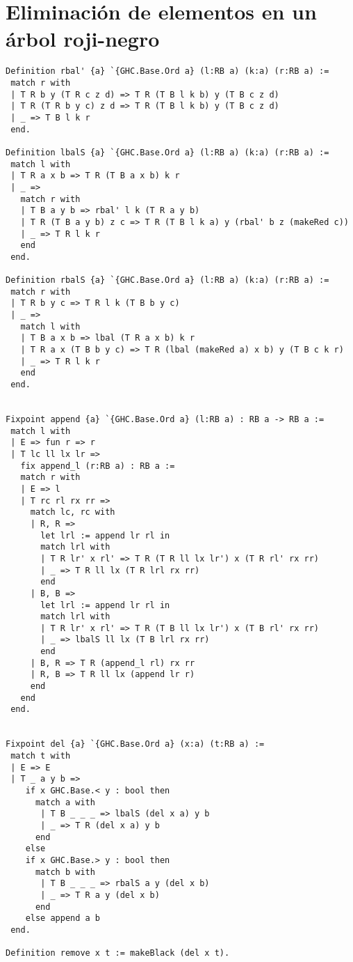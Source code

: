 \documentclass[letterpaper,12pt,oneside]{book}
\newcommand{\arn}{árbol roji-negro}
\theoremstyle{plain}
\theoremstyle{definition}
\theoremstyle{remark}
\begin{document}
\section{Eliminación de elementos en un {\arn}}
\begin{verbatim}
Definition rbal' {a} `{GHC.Base.Ord a} (l:RB a) (k:a) (r:RB a) :=
 match r with
 | T R b y (T R c z d) => T R (T B l k b) y (T B c z d)
 | T R (T R b y c) z d => T R (T B l k b) y (T B c z d)
 | _ => T B l k r
 end.

Definition lbalS {a} `{GHC.Base.Ord a} (l:RB a) (k:a) (r:RB a) :=
 match l with
 | T R a x b => T R (T B a x b) k r
 | _ =>
   match r with
   | T B a y b => rbal' l k (T R a y b)
   | T R (T B a y b) z c => T R (T B l k a) y (rbal' b z (makeRed c))
   | _ => T R l k r 
   end
 end.

Definition rbalS {a} `{GHC.Base.Ord a} (l:RB a) (k:a) (r:RB a) :=
 match r with
 | T R b y c => T R l k (T B b y c)
 | _ =>
   match l with
   | T B a x b => lbal (T R a x b) k r
   | T R a x (T B b y c) => T R (lbal (makeRed a) x b) y (T B c k r)
   | _ => T R l k r 
   end
 end.


Fixpoint append {a} `{GHC.Base.Ord a} (l:RB a) : RB a -> RB a :=
 match l with
 | E => fun r => r
 | T lc ll lx lr =>
   fix append_l (r:RB a) : RB a :=
   match r with
   | E => l
   | T rc rl rx rr =>
     match lc, rc with
     | R, R =>
       let lrl := append lr rl in
       match lrl with
       | T R lr' x rl' => T R (T R ll lx lr') x (T R rl' rx rr)
       | _ => T R ll lx (T R lrl rx rr)
       end
     | B, B =>
       let lrl := append lr rl in
       match lrl with
       | T R lr' x rl' => T R (T B ll lx lr') x (T B rl' rx rr)
       | _ => lbalS ll lx (T B lrl rx rr)
       end
     | B, R => T R (append_l rl) rx rr
     | R, B => T R ll lx (append lr r)
     end
   end
 end.


Fixpoint del {a} `{GHC.Base.Ord a} (x:a) (t:RB a) :=
 match t with
 | E => E
 | T _ a y b =>
    if x GHC.Base.< y : bool then 
      match a with
       | T B _ _ _ => lbalS (del x a) y b
       | _ => T R (del x a) y b
      end
    else 
    if x GHC.Base.> y : bool then 
      match b with
       | T B _ _ _ => rbalS a y (del x b)
       | _ => T R a y (del x b)
      end
    else append a b
 end.

Definition remove x t := makeBlack (del x t).
\end{verbatim}
\end{document}
